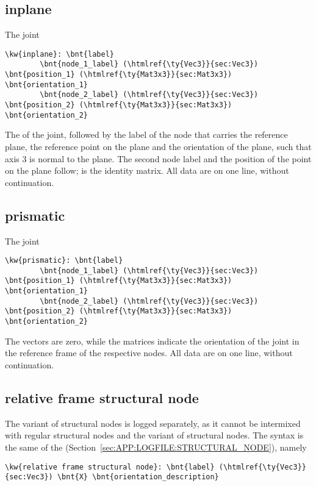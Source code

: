 \subsection{inplane}
The  joint
\begin{Verbatim}[commandchars=\\\{\}]
    \kw{inplane}: \bnt{label}
        \bnt{node_1_label} (\htmlref{\ty{Vec3}}{sec:Vec3}) \bnt{position_1} (\htmlref{\ty{Mat3x3}}{sec:Mat3x3}) \bnt{orientation_1}
        \bnt{node_2_label} (\htmlref{\ty{Vec3}}{sec:Vec3}) \bnt{position_2} (\htmlref{\ty{Mat3x3}}{sec:Mat3x3}) \bnt{orientation_2}
\end{Verbatim}
The  of the joint, followed by the label of the node
that carries the reference plane, the reference point 
on the plane and the orientation  of the plane,
such that axis 3 is normal to the plane.
The second node label and the position of the point on the plane
follow;  is the identity matrix.
All data are on one line, without continuation.

\subsection{prismatic}
The  joint
\begin{Verbatim}[commandchars=\\\{\}]
    \kw{prismatic}: \bnt{label}
        \bnt{node_1_label} (\htmlref{\ty{Vec3}}{sec:Vec3}) \bnt{position_1} (\htmlref{\ty{Mat3x3}}{sec:Mat3x3}) \bnt{orientation_1}
        \bnt{node_2_label} (\htmlref{\ty{Vec3}}{sec:Vec3}) \bnt{position_2} (\htmlref{\ty{Mat3x3}}{sec:Mat3x3}) \bnt{orientation_2}
\end{Verbatim}
The  vectors are zero,
while the  matrices indicate the orientation 
of the joint in the reference frame of the respective nodes.
All data are on one line, without continuation.

\subsection{relative frame structural node}
The  variant of  structural nodes
is logged separately, as it cannot be intermixed with regular structural nodes
and the  variant of  structural nodes.
The syntax is the same of the 
(Section~\ref{sec:APP:LOGFILE:STRUCTURAL_NODE}), namely
\begin{Verbatim}[commandchars=\\\{\}]
    \kw{relative frame structural node}: \bnt{label} (\htmlref{\ty{Vec3}}{sec:Vec3}) \bnt{X} \bnt{orientation_description}
\end{Verbatim}

